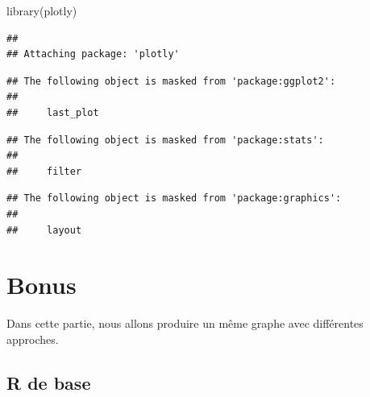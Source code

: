 \documentclass[
]{book}
\newenvironment{Shaded}{\begin{snugshade}}{\end{snugshade}}
\newcommand{\AttributeTok}[1]{\textcolor[rgb]{0.77,0.63,0.00}{#1}}
\newcommand{\FunctionTok}[1]{\textcolor[rgb]{0.00,0.00,0.00}{#1}}
\newcommand{\NormalTok}[1]{#1}
\newcommand{\SpecialCharTok}[1]{\textcolor[rgb]{0.00,0.00,0.00}{#1}}
\newcommand{\StringTok}[1]{\textcolor[rgb]{0.31,0.60,0.02}{#1}}
\begin{document}
\begin{Shaded}
\begin{Highlighting}[]
\FunctionTok{library}\NormalTok{(plotly)}
\end{Highlighting}
\end{Shaded}

\begin{verbatim}
## 
## Attaching package: 'plotly'
\end{verbatim}

\begin{verbatim}
## The following object is masked from 'package:ggplot2':
## 
##     last_plot
\end{verbatim}

\begin{verbatim}
## The following object is masked from 'package:stats':
## 
##     filter
\end{verbatim}

\begin{verbatim}
## The following object is masked from 'package:graphics':
## 
##     layout
\end{verbatim}

\begin{Shaded}
\end{Shaded}

\hypertarget{bonus}{%
\chapter{Bonus}\label{bonus}}

Dans cette partie, nous allons produire un même graphe avec différentes approches.

\hypertarget{r-de-base}{%
\section{R de base}\label{r-de-base}}
\end{document}
